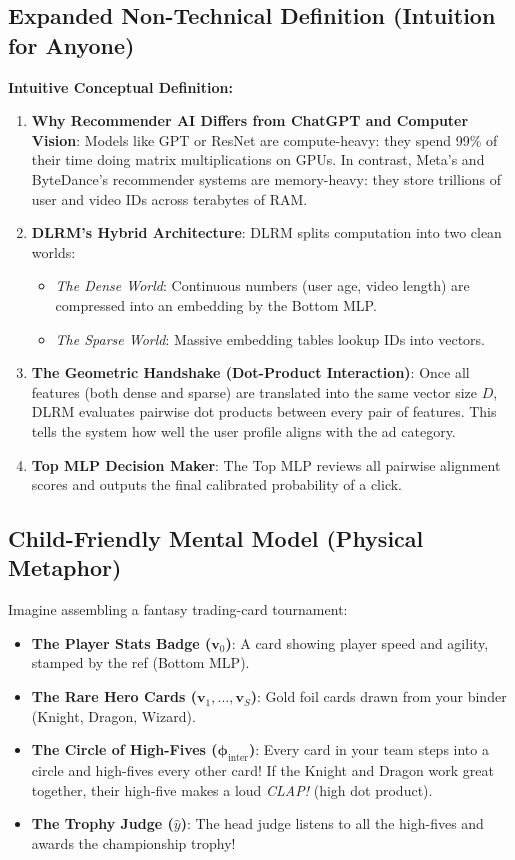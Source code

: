 \documentclass[11pt,a4paper]{article}
\theoremstyle{definition}
\begin{document}
\subsection{Expanded Non-Technical Definition (Intuition for Anyone)}
\textbf{Intuitive Conceptual Definition:}
\begin{enumerate}
    \item \textbf{Why Recommender AI Differs from ChatGPT and Computer Vision}: Models like GPT or ResNet are compute-heavy: they spend 99\% of their time doing matrix multiplications on GPUs. In contrast, Meta's and ByteDance's recommender systems are memory-heavy: they store trillions of user and video IDs across terabytes of RAM.
    \item \textbf{DLRM's Hybrid Architecture}: DLRM splits computation into two clean worlds:
    \begin{itemize}
        \item \emph{The Dense World}: Continuous numbers (user age, video length) are compressed into an embedding by the Bottom MLP.
        \item \emph{The Sparse World}: Massive embedding tables lookup IDs into vectors.
    \end{itemize}
    \item \textbf{The Geometric Handshake (Dot-Product Interaction)}: Once all features (both dense and sparse) are translated into the same vector size $D$, DLRM evaluates pairwise dot products between every pair of features. This tells the system how well the user profile aligns with the ad category.
    \item \textbf{Top MLP Decision Maker}: The Top MLP reviews all pairwise alignment scores and outputs the final calibrated probability of a click.
\end{enumerate}

\subsection{Child-Friendly Mental Model (Physical Metaphor)}
Imagine assembling a fantasy trading-card tournament:
\begin{itemize}
    \item \textbf{The Player Stats Badge ($\mathbf{v}_0$)}: A card showing player speed and agility, stamped by the ref (Bottom MLP).
    \item \textbf{The Rare Hero Cards ($\mathbf{v}_1, \dots, \mathbf{v}_S$)}: Gold foil cards drawn from your binder (Knight, Dragon, Wizard).
    \item \textbf{The Circle of High-Fives ($\boldsymbol{\phi}_{\text{inter}}$)}: Every card in your team steps into a circle and high-fives every other card! If the Knight and Dragon work great together, their high-five makes a loud \emph{CLAP!} (high dot product).
    \item \textbf{The Trophy Judge ($\widehat{y}$)}: The head judge listens to all the high-fives and awards the championship trophy!
\end{itemize}
\end{document}
